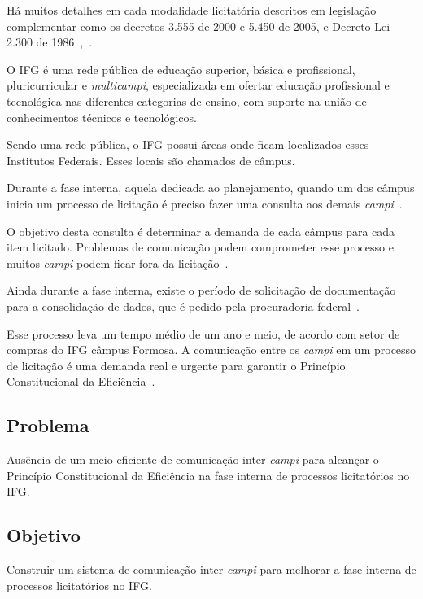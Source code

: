 Há muitos detalhes em cada modalidade licitatória descritos em legislação complementar como os decretos 3.555 de 2000 e 5.450 de 2005, e Decreto-Lei 2.300 de 1986~\cite{l3555},~\cite{l5450}.

O IFG é uma rede pública de educação superior, básica e profissional, pluricurricular e \textit{multicampi}, especializada em ofertar educação profissional e tecnológica nas diferentes categorias de ensino, com suporte na união de conhecimentos técnicos e tecnológicos.

Sendo uma rede pública, o IFG possui áreas onde ficam localizados esses Institutos Federais.
Esses locais são chamados de câmpus.

Durante a fase interna, aquela dedicada ao planejamento, quando um dos câmpus inicia um processo de licitação é preciso fazer uma consulta aos demais \textit{campi}~\cite{carvalho2013manual}. 

O objetivo desta consulta é determinar a demanda de cada câmpus para cada item licitado. 
Problemas de comunicação podem comprometer esse processo e muitos \textit{campi} podem ficar fora da licitação~\cite{fernandes2005politicas}.

Ainda durante a fase interna, existe o período de solicitação de documentação para a consolidação de dados, que é pedido pela procuradoria federal~\cite{de2007curso}. 

Esse processo leva um tempo médio de um ano e meio, de acordo com setor de compras do IFG câmpus Formosa.
A comunicação entre os \textit{campi} em um processo de licitação é uma demanda real e urgente para garantir o Princípio Constitucional da Eficiência~\cite{l1988}.

\subsection*{Problema}
Ausência de um meio eficiente de comunicação inter-\textit{campi} para alcançar o Princípio Constitucional da Eficiência na fase interna de processos licitatórios no IFG.


\subsection*{Objetivo}

Construir um sistema de comunicação inter-\textit{campi} para melhorar a fase interna de processos licitatórios no IFG.

